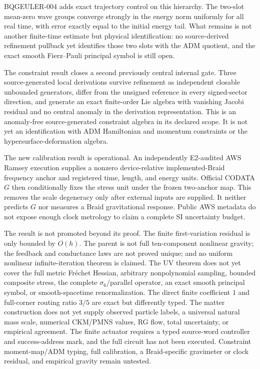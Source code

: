 \documentclass[11pt]{article}
\theoremstyle{definition}
\theoremstyle{remark}
\begin{document}
BQGEULER-004 adds exact trajectory control on this hierarchy. The two-slot mean-zero wave groups converge strongly in the energy norm uniformly for all real time, with error exactly equal to the initial energy tail. What remains is not another finite-time estimate but physical identification: no source-derived refinement pullback yet identifies those two slots with the ADM quotient, and the exact smooth Fierz--Pauli principal symbol is still open.

The constraint result closes a second previously central internal gate. Three source-generated local derivations survive refinement as independent closable unbounded generators, differ from the unsigned reference in every signed-sector direction, and generate an exact finite-order Lie algebra with vanishing Jacobi residual and no central anomaly in the derivation representation. This is an anomaly-free source-generated constraint algebra in its declared scope. It is not yet an identification with ADM Hamiltonian and momentum constraints or the hypersurface-deformation algebra.

The new calibration result is operational. An independently E2-audited AWS Ramsey execution supplies a nonzero device-relative implemented-Braid frequency anchor and registered time, length, and energy units. Official CODATA $G$ then conditionally fixes the stress unit under the frozen two-anchor map. This removes the scale degeneracy only after external inputs are supplied. It neither predicts $G$ nor measures a Braid gravitational response. Public AWS metadata do not expose enough clock metrology to claim a complete SI uncertainty budget.

The result is not promoted beyond its proof. The finite first-variation residual is only bounded by $O(h)$. The parent is not full ten-component nonlinear gravity; the feedback and conductance laws are not proved unique; and no uniform nonlinear infinite-iteration theorem is claimed. The UV theorem does not yet cover the full metric Fr\'echet Hessian, arbitrary nonpolynomial sampling, bounded composite stress, the complete $\sigma_6$/parallel operator, an exact smooth principal symbol, or smooth-spacetime renormalization. The direct finite coefficient $1$ and full-corner routing ratio $3/5$ are exact but differently typed. The matter construction does not yet supply observed particle labels, a universal natural mass scale, numerical CKM/PMNS values, RG flow, total uncertainty, or empirical agreement. The finite actuator requires a typed source-word controller and success-address mark, and the full circuit has not been executed. Constraint moment-map/ADM typing, full calibration, a Braid-specific gravimeter or clock residual, and empirical gravity remain untested.
\end{document}
